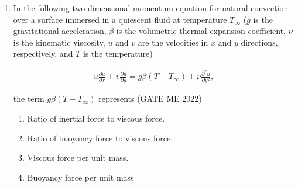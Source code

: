 \documentclass[journal]{IEEEtran}
\numberwithin{equation}{enumi}
\numberwithin{figure}{enumi}
\begin{document}
\begin{enumerate}
(x=1, y =1, t =1) is
\hfill{(GATE ME 2022)}
\begin{multicols}{4}
    \begin{enumerate}
        \item 4
        \item 0
        \item 8
        \item 14
    \end{enumerate}
\end{multicols}

\item In the following two-dimensional momentum equation for natural convection over a surface immersed in a quiescent fluid at temperature \( T_\infty \) 
(\( g \) is the gravitational acceleration, \( \beta \) is the volumetric thermal expansion coefficient, \( \nu \) is the kinematic viscosity, 
\( u \) and \( v \) are the velocities in \( x \) and \( y \) directions, respectively, and \( T \) is the temperature)

\begin{align*}
u \frac{\partial u}{\partial x} + v \frac{\partial u}{\partial y} 
= g \beta (T - T_\infty) + \nu \frac{\partial^2 u}{\partial y^2},
\end{align*}

the term \( g \beta (T - T_\infty) \) represents
\hfill{(GATE ME 2022)}
\begin{enumerate}

\item 
Ratio of inertial force to viscous force. 
\item
Ratio of buoyancy force to viscous force. 
\item
Viscous force per unit mass. 
\item Buoyancy force per unit mass
\end{enumerate}


\end{enumerate}
\end{document}
